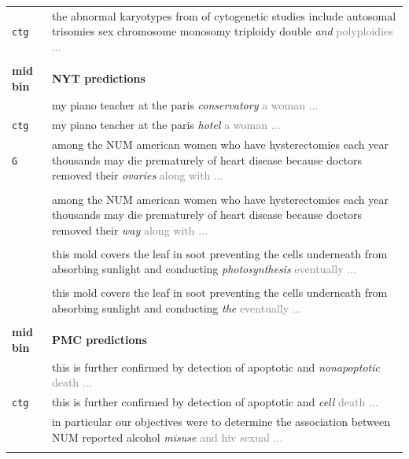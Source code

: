 \documentclass[11pt,a4paper]{article}
\begin{document}
\begin{table}[t]
\begin{tabularx}{\linewidth}{ll}
    {\tt ctg} & \multirow{1}{*}{\parbox{13cm}{the abnormal karyotypes from of cytogenetic studies include autosomal trisomies sex chromosome monosomy triploidy double \textit{and} \textcolor{gray}{polyploidies ...}}} \\ \\
    \addlinespace[1ex]
    \textbf{mid bin} & \textbf{NYT predictions}  \\
    \addlinespace[1ex]
    {\tt G} & my piano teacher at the paris \textit{conservatory} \textcolor{gray}{a woman ...} \\
    {\tt ctg} & my piano teacher at the paris \textit{hotel} \textcolor{gray}{a woman ...} \\
    \addlinespace[1ex]

    {\tt G} & \multirow{1}{*}{\parbox{13cm}{among the NUM american women who have hysterectomies each year thousands may die prematurely of heart disease because doctors removed their \textit{ovaries} \textcolor{gray}{along with ...}}} \\ \\
    \addlinespace[1ex]
    {\tt ctg} & \multirow{1}{*}{\parbox{13cm}{among the NUM american women who have hysterectomies each year thousands may die prematurely of heart disease because doctors removed their \textit{way} \textcolor{gray}{along with ...}}} \\ \\
    \addlinespace[1ex]
    {\tt G} & \multirow{1}{*}{\parbox{13cm}{this mold covers the leaf in soot preventing the cells underneath from absorbing sunlight and conducting \textit{photosynthesis} \textcolor{gray}{eventually ...}}} \\ \\
    \addlinespace[1ex]
    {\tt ctg} & \multirow{1}{*}{\parbox{13cm}{this mold covers the leaf in soot preventing the cells underneath from absorbing sunlight and conducting \textit{the} \textcolor{gray}{eventually ...}}} \\ \\
    \addlinespace[1ex]
    \textbf{mid bin} & \textbf{PMC predictions}  \\
    \addlinespace[1ex]
    {\tt G} & this is further confirmed by detection of apoptotic and \textit{nonapoptotic} \textcolor{gray}{death ...} \\
    {\tt ctg} & this is further confirmed by detection of apoptotic and \textit{cell} \textcolor{gray}{death ...} \\
    \addlinespace[1ex] 
    {\tt G} & \multirow{1}{*}{\parbox{13cm}{in particular our objectives were to determine the association between NUM reported alcohol \textit{misuse} \textcolor{gray}{and hiv sexual ...}}} \\ \\

\end{tabularx}
\end{table}
\end{document}
